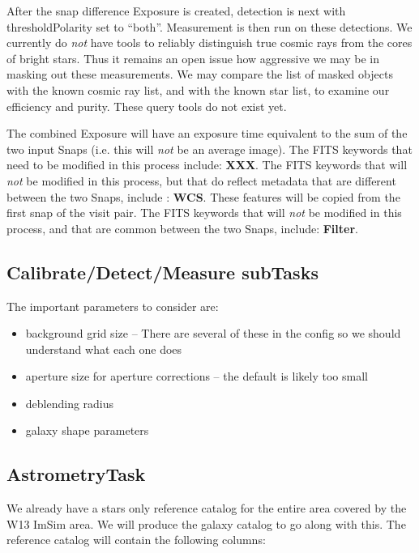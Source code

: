 \documentclass[12pt]{article}
\begin{document}
After the snap difference Exposure is created, detection is next with
thresholdPolarity set to ``both''.  Measurement is then run on these
detections.  We currently do {\it not} have tools to reliably
distinguish true cosmic rays from the cores of bright stars.  Thus it
remains an open issue how aggressive we may be in masking out these
measurements.  We may compare the list of masked objects with the
known cosmic ray list, and with the known star list, to examine our
efficiency and purity.  These query tools do not exist yet.

The combined Exposure will have an exposure time equivalent to the sum
of the two input Snaps (i.e. this will {\it not} be an average image).
The FITS keywords that need to be modified in this process include:
{\bf XXX}.  The FITS keywords that will {\it not} be modified in this
process, but that do reflect metadata that are different between the
two Snaps, include : {\bf WCS}.  These features will be copied from
the first snap of the visit pair.  The FITS keywords that will {\it
  not} be modified in this process, and that are common between the
two Snaps, include: {\bf Filter}.

\subsection{Calibrate/Detect/Measure subTasks}
The important parameters to consider are:
\begin{itemize} 
\item background grid size -- There are several of these in the config
  so we should understand what each one does
\item aperture size for aperture corrections -- the default is likely
  too small
\item deblending radius
\item galaxy shape parameters
\end{itemize}

\subsection{AstrometryTask} 

We already have a stars only reference catalog for the entire area
covered by the W13 ImSim area.  We will produce the galaxy catalog to
go along with this.  The reference catalog will contain the following
columns:
\end{document}
